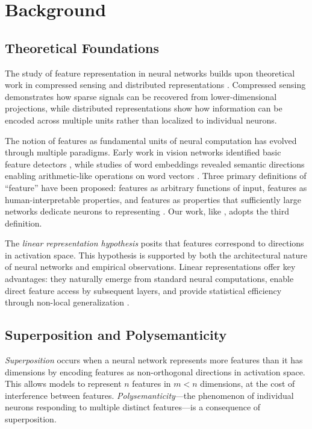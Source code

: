 \section{Background}

\subsection{Theoretical Foundations}

The study of feature representation in neural networks builds upon theoretical work in compressed sensing \citep{donoho2006compressed} and distributed representations \citep{thorpe1989local}. Compressed sensing demonstrates how sparse signals can be recovered from lower-dimensional projections, while distributed representations show how information can be encoded across multiple units rather than localized to individual neurons.

The notion of features as fundamental units of neural computation has evolved through multiple paradigms. Early work in vision networks identified basic feature detectors \citep{olah2020zoom}, while studies of word embeddings revealed semantic directions enabling arithmetic-like operations on word vectors \citep{mikolov2013linguistic}. Three primary definitions of ``feature'' have been proposed: features as arbitrary functions of input, features as human-interpretable properties, and features as properties that sufficiently large networks dedicate neurons to representing \citep{olah2017feature}. Our work, like \citet{elhage2022toy}, adopts the third definition.

The \emph{linear representation hypothesis} posits that features correspond to directions in activation space. This hypothesis is supported by both the architectural nature of neural networks and empirical observations. Linear representations offer key advantages: they naturally emerge from standard neural computations, enable direct feature access by subsequent layers, and provide statistical efficiency through non-local generalization \citep{bengio2013representation}.

\subsection{Superposition and Polysemanticity}

\emph{Superposition} occurs when a neural network represents more features than it has dimensions by encoding features as non-orthogonal directions in activation space. This allows models to represent $n$ features in $m < n$ dimensions, at the cost of interference between features. \emph{Polysemanticity}---the phenomenon of individual neurons responding to multiple distinct features---is a consequence of superposition.

